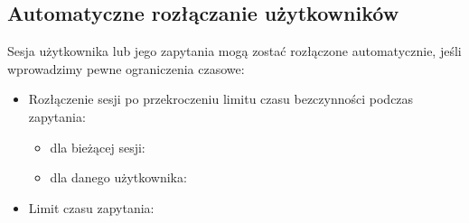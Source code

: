 \documentclass[a4paper,11pt,polish]{sphinxmanual}
\begin{document}
\subsection{Automatyczne rozłączanie użytkowników}
\label{\detokenize{Kontrola_i_konserwacja/kontrola_i_konserwacja:automatyczne-rozlaczanie-uzytkownikow}}
\sphinxAtStartPar
Sesja użytkownika lub jego zapytania mogą zostać rozłączone automatycznie, jeśli wprowadzimy pewne ograniczenia czasowe:
\begin{itemize}
\item {} 
\sphinxAtStartPar
Rozłączenie sesji po przekroczeniu limitu czasu bezczynności podczas zapytania:
\begin{itemize}
\item {} 
\sphinxAtStartPar
dla bieżącej sesji:
\begin{quote}

\begin{sphinxVerbatim}[commandchars=\\\{\}]
\end{sphinxVerbatim}
\end{quote}

\item {} 
\sphinxAtStartPar
dla danego użytkownika:
\begin{quote}

\begin{sphinxVerbatim}[commandchars=\\\{\}]
\end{sphinxVerbatim}
\end{quote}

\end{itemize}

\item {} 
\sphinxAtStartPar
Limit czasu zapytania:
\begin{quote}

\begin{sphinxVerbatim}[commandchars=\\\{\}]
\end{sphinxVerbatim}
\end{quote}

\end{itemize}
\end{document}
